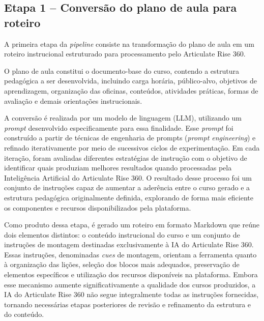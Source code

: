 \documentclass[12pt,a4paper]{article}
\begin{document}
\subsection{Etapa 1 -- Conversão do plano de aula para roteiro}

A primeira etapa da \textit{pipeline} consiste na transformação do plano de aula em um roteiro instrucional estruturado para processamento pelo Articulate Rise 360.

O plano de aula constitui o documento-base do curso, contendo a estrutura pedagógica a ser desenvolvida, incluindo carga horária, público-alvo, objetivos de aprendizagem, organização das oficinas, conteúdos, atividades práticas, formas de avaliação e demais orientações instrucionais.

A conversão é realizada por um modelo de linguagem (LLM), utilizando um \textit{prompt} desenvolvido especificamente para essa finalidade. Esse \textit{prompt} foi construído a partir de técnicas de engenharia de prompts (\textit{prompt engineering}) e refinado iterativamente por meio de sucessivos ciclos de experimentação. Em cada iteração, foram avaliadas diferentes estratégias de instrução com o objetivo de identificar quais produziam melhores resultados quando processadas pela Inteligência Artificial do Articulate Rise 360. O resultado desse processo foi um conjunto de instruções capaz de aumentar a aderência entre o curso gerado e a estrutura pedagógica originalmente definida, explorando de forma mais eficiente os componentes e recursos disponibilizados pela plataforma. 

Como produto dessa etapa, é gerado um roteiro em formato Markdown que reúne dois elementos distintos: o conteúdo instrucional do curso e um conjunto de instruções de montagem destinadas exclusivamente à IA do Articulate Rise 360. Essas instruções, denominadas \textit{cues} de montagem, orientam a ferramenta quanto à organização das lições, seleção dos blocos mais adequados, preservação de elementos específicos e utilização dos recursos disponíveis na plataforma. Embora esse mecanismo aumente significativamente a qualidade dos cursos produzidos, a IA do Articulate Rise 360 não segue integralmente todas as instruções fornecidas, tornando necessárias etapas posteriores de revisão e refinamento da estrutura e do conteúdo.
\end{document}
